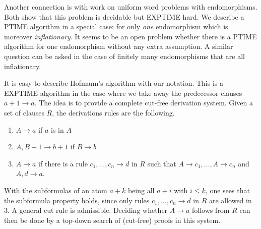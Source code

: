 \documentclass[11pt,a4paper]{article}
\begin{document}
Another connection is with work on uniform word problems with
endomorphisms. Both \cite{Baader,Hofmann} show that this problem is decidable
but EXPTIME hard. We describe a PTIME algorithm in a special case: for
only {\em one} endomorphism which is moreover \emph{inflationary}.
It seems to be an open problem whether there is a PTIME algorithm for
one endomorphism without any extra assumption. A similar
question can be asked in the case of finitely many endomorphisms
that are all inflationary.

It is easy to describe Hofmann's \cite{Hofmann} algorithm with
our notation. This is a EXPTIME algorithm in the case where
we take away the predecessor clauses $a+1\to a$. 
The idea is to provide a complete cut-free derivation system. 
Given a set of clauses $R$, the derivations rules are the following.

\begin{enumerate}
\item $A\to a$ if $a$ is in $A$
\item $A,B+1\to b+1$ if $B\to b$
\item $A\to a$ if there is a rule $c_1,\dots,c_n\to d$ in $R$ such that 
  $A\to c_1,\dots,A\to c_n$ and $A,d\to a$.
\end{enumerate}
With the subformulas of an atom $a+k$ being all $a+i$ with $i\leqslant k$,
one sees that the subformula property holds, since only rules
$c_1,\dots,c_n\to d$ in $R$ are allowed in 3. A general cut rule
is admissible. Deciding whether $A\to a$ follows from $R$
can then be done by a top-down search of (cut-free) proofs in this system.
\end{document}

